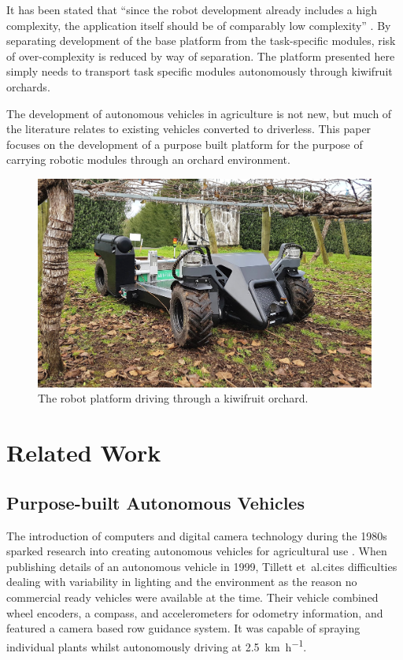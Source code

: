 \documentclass[preprint,authoryear,12pt]{elsarticle}
\begin{document}
    It has been stated that ``since the robot development already includes a high complexity, the application itself should be of comparably low complexity'' \citep{Ruckelshausen2009}.
    By separating development of the base platform from the task-specific modules, risk of over-complexity is reduced by way of separation.
    The platform presented here simply needs to transport task specific modules autonomously through kiwifruit orchards.

    The development of autonomous vehicles in agriculture is not new, but much of the literature relates to existing vehicles converted to driverless.
    This paper focuses on the development of a purpose built platform for the purpose of carrying robotic modules through an orchard environment.

    \begin{figure}[htb]
        \centering
        \includegraphics[width=\linewidth]{imgs/photos/suzy_general.jpg}
        \caption{
            The robot platform driving through a kiwifruit orchard.
        }
        \label{fig:suzy}
    \end{figure}

\section{Related Work}
\label{sect:review}

    \subsection{Purpose-built Autonomous Vehicles}

        The introduction of computers and digital camera technology during the 1980s sparked research into creating autonomous vehicles for agricultural use \cite{Li2009}.
        When publishing details of an autonomous vehicle in 1999, Tillett et~al.\@ cites difficulties dealing with variability in lighting and the environment as the reason no commercial ready vehicles were available at the time.
        Their vehicle combined wheel encoders, a compass, and accelerometers for odometry information, and featured a camera based row guidance system.
        It was capable of spraying individual plants whilst autonomously driving at \SI{2.5}{\kilo\meter\per\hour}.
        
\end{document}
